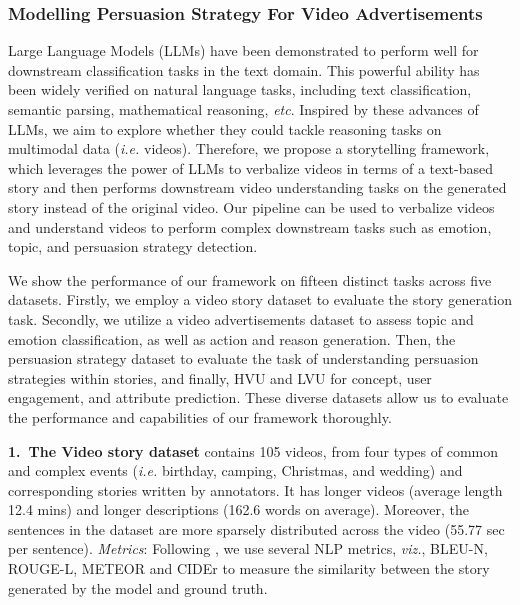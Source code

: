 


\subsubsection{Modelling Persuasion Strategy For Video Advertisements}
Large Language Models (LLMs) have been demonstrated to perform well for downstream classification tasks in the text domain. This powerful ability has been widely verified on natural language tasks, including text classification, semantic parsing, mathematical reasoning, \textit{etc}. Inspired by these advances of LLMs, we aim to explore whether they could tackle reasoning tasks on multimodal data (\textit{i.e.} videos). Therefore, we propose a storytelling framework, which leverages the power of LLMs to verbalize videos in terms of a text-based story and then performs downstream video understanding tasks on the generated story instead of the original video. Our pipeline can be used to verbalize videos and understand videos to perform complex downstream tasks such as emotion, topic, and persuasion strategy detection. 


We show the performance of our framework on fifteen distinct tasks across five datasets. Firstly, we employ a video story dataset to evaluate the story generation task. Secondly, we utilize a video advertisements dataset to assess topic and emotion classification, as well as action and reason generation. Then, the persuasion strategy dataset to evaluate the task of understanding persuasion strategies within stories, and finally, HVU and LVU for concept, user engagement, and attribute prediction. These diverse datasets allow us to evaluate the performance and capabilities of our framework thoroughly.


\textbf{1.~The Video story dataset} \cite{Li_2020} contains 105 videos, from four types of common and complex events (\textit{i.e.} birthday, camping, Christmas, and wedding) and corresponding stories written by annotators. It has longer videos (average length 12.4 mins) and longer descriptions (162.6 words on average).
Moreover, the sentences in the dataset are more sparsely distributed across the video (55.77 sec per sentence).
\textit{Metrics}: Following \cite{Li_2020}, we use several NLP metrics, \textit{viz.}, BLEU-N, ROUGE-L, METEOR and CIDEr to measure the similarity between the story generated by the model and ground truth.


